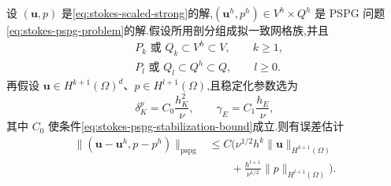\begin{theorem}[有限元误差估计]\label{thm:stokes-pspg-error-estimate}
设 $(\bm{u},p)$ 是\cref{eq:stokes-scaled-strong}的解,$(\bm{u}^h,p^h)\in V^h\times Q^h$ 是 PSPG 问题\cref{eq:stokes-pspg-problem}的解.假设所用剖分组成拟一致网格族,并且
\[
 \begin{aligned}
  &P_k\text{ 或 }Q_k\subset V^h\subset V,\qquad k\geq1,\\
  &P_l\text{ 或 }Q_l\subset Q^h\subset Q,\qquad l\geq0.
 \end{aligned}
\]
再假设 $\bm{u}\in H^{k+1}(\Omega)^d$、$p\in H^{l+1}(\Omega)$,且稳定化参数选为
\begin{equation}\label{eq:stokes-pspg-stabilization-choice}
 \delta_K^p=C_0\frac{h_K^2}{\nu},\qquad
 \gamma_E=C_1\frac{h_E}{\nu},
\end{equation}
其中 $C_0$ 使条件\cref{eq:stokes-pspg-stabilization-bound}成立.则有误差估计
\begin{equation}\label{eq:stokes-pspg-error-bound}
\begin{aligned}
 \| (\bm{u}-\bm{u}^h,p-p^h)\|_{\mathrm{pspg}}
 &\leq C\Biggl(
    \nu^{1/2}h^k\|\bm{u}\|_{H^{k+1}(\Omega)}\\
 &\qquad+\frac{h^{l+1}}{\nu^{1/2}}\|p\|_{H^{l+1}(\Omega)}
 \Biggr).
\end{aligned}
\end{equation}
\end{theorem}
